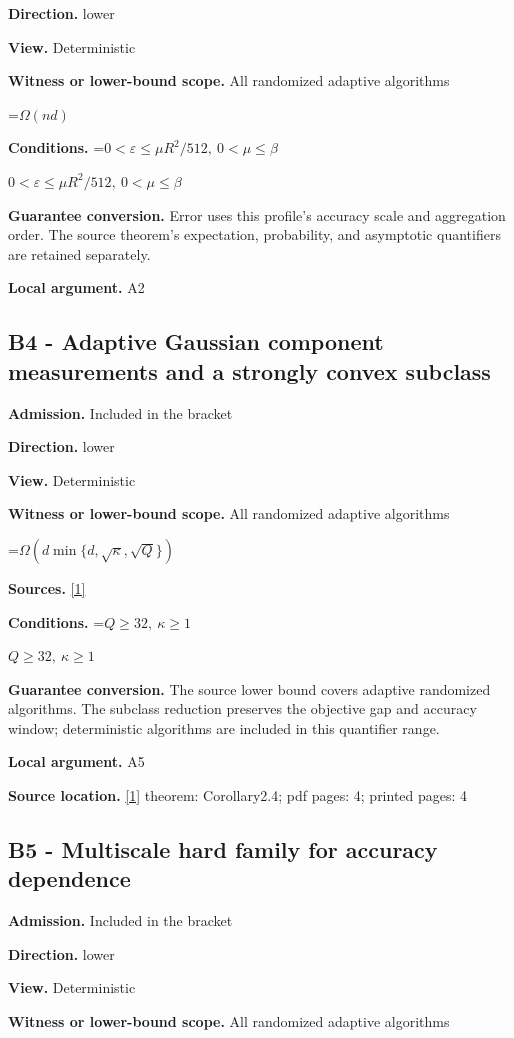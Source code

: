 \documentclass[10pt,a4paper]{article}
\newcommand{\AtlasMath}[1]{\par\begingroup\centering\setbox0=\hbox{$\displaystyle #1$}\ifdim\wd0>1.4\linewidth\typeout{ATLAS WIDE FORMULA: \the\wd0}\fi\ifdim\wd0>\linewidth\resizebox{\linewidth}{!}{\box0}\else\box0\fi\par\endgroup}
\newcommand{\AtlasInlineMath}[1]{\begingroup\setbox0=\hbox{$#1$}\ifdim\wd0>.4\linewidth\endgroup\AtlasMath{#1}\else\endgroup$#1$\fi}
\begin{document}
\textbf{Direction.} lower

\textbf{View.} Deterministic

\textbf{Witness or lower-bound scope.} All randomized adaptive algorithms

\AtlasMath{\Omega(nd)}
\textbf{Conditions.} \AtlasInlineMath{0<\varepsilon\le\mu R^2/512,\ 0<\mu\le\beta}

\textbf{Guarantee conversion.} Error uses this profile's accuracy scale and aggregation order. The source theorem's expectation, probability, and asymptotic quantifiers are retained separately.

\textbf{Local argument.} A2

\subsection{B4 - Adaptive Gaussian component measurements and a strongly convex subclass}
\textbf{Admission.} Included in the bracket

\textbf{Direction.} lower

\textbf{View.} Deterministic

\textbf{Witness or lower-bound scope.} All randomized adaptive algorithms

\AtlasMath{\Omega(d\min\{d,\sqrt\kappa,\sqrt Q\})}
\textbf{Sources.} \href{https://arxiv.org/html/2610.00345v1}{[1]}

\textbf{Conditions.} \AtlasInlineMath{Q\ge32,\ \kappa\ge1}

\textbf{Guarantee conversion.} The source lower bound covers adaptive randomized algorithms. The subclass reduction preserves the objective gap and accuracy window; deterministic algorithms are included in this quantifier range.

\textbf{Local argument.} A5

\textbf{Source location.} \href{https://arxiv.org/html/2610.00345v1}{[1]} theorem: Corollary2.4; pdf pages: 4; printed pages: 4

\subsection{B5 - Multiscale hard family for accuracy dependence}
\textbf{Admission.} Included in the bracket

\textbf{Direction.} lower

\textbf{View.} Deterministic

\textbf{Witness or lower-bound scope.} All randomized adaptive algorithms
\end{document}
